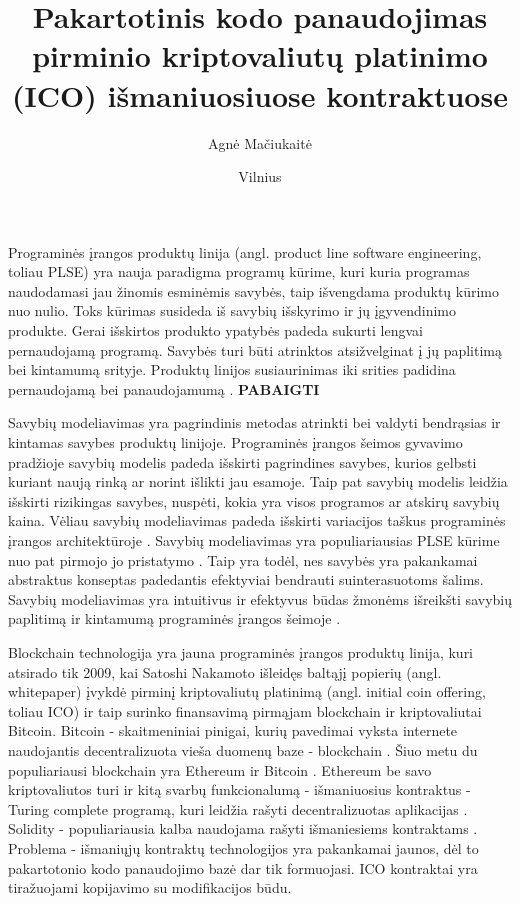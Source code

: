 \documentclass{VUMIFInfKursinis}
\title{Pakartotinis kodo panaudojimas pirminio kriptovaliutų platinimo (ICO) išmaniuosiuose kontraktuose}
\author{Agnė Mačiukaitė}
\date{Vilnius \\ \the\year}
\begin{document}
\maketitle

\tableofcontents

%
Programinės įrangos produktų linija (angl. product line software engineering, toliau PLSE) yra nauja paradigma programų kūrime, kuri kuria programas naudodamasi jau žinomis esminėmis savybės, taip išvengdama produktų kūrimo nuo nulio. Toks kūrimas susideda iš savybių išskyrimo ir jų įgyvendinimo produkte. Gerai išskirtos produkto ypatybės padeda sukurti lengvai pernaudojamą programą. Savybės turi būti atrinktos atsižvelginat į jų paplitimą bei kintamumą srityje. Produktų linijos susiaurinimas iki srities padidina pernaudojamą bei panaudojamumą \cite{Lee2015}. \textbf{PABAIGTI}

Savybių modeliavimas yra pagrindinis metodas atrinkti bei valdyti bendrąsias ir kintamas savybes produktų linijoje. Programinės įrangos šeimos gyvavimo pradžioje savybių modelis padeda išskirti pagrindines savybes, kurios gelbsti kuriant naują rinką ar  norint išlikti jau esamoje. Taip pat savybių modelis leidžia išskirti rizikingas savybes, nuspėti, kokia yra visos programos ar atskirų savybių kaina. Vėliau savybių modeliavimas padeda išskirti variacijos taškus programinės įrangos architektūroje \cite{Czarnecki2004}. Savybių modeliavimas yra populiariausias PLSE kūrime nuo pat pirmojo jo pristatymo \cite{Kang1990}. Taip yra todėl, nes savybės yra pakankamai abstraktus konseptas padedantis efektyviai bendrauti suinterasuotoms šalims. Savybių modeliavimas yra intuitivus ir efektyvus būdas žmonėms išreikšti savybių paplitimą ir kintamumą programinės įrangos šeimoje \cite{Kang2013}. 

Blockchain technologija yra jauna programinės įrangos produktų linija, kuri atsirado tik 2009, kai Satoshi Nakamoto išleidęs baltąjį popierių (angl. whitepaper) \cite{Nakamoto2008} įvykdė pirminį kriptovaliutų platinimą (angl. initial coin offering, toliau ICO)  ir taip surinko finansavimą pirmąjam blockchain ir kriptovaliutai Bitcoin. Bitcoin - skaitmeniniai pinigai, kurių pavedimai vyksta internete naudojantis decentralizuota vieša duomenų baze - blockchain \cite{Swan2015}. Šiuo metu du populiariausi blockchain yra Ethereum ir Bitcoin \cite{Luu}. Ethereum be savo kriptovaliutos turi ir kitą svarbų funkcionalumą - išmaniuosius kontraktus - Turing complete programą, kuri leidžia rašyti decentralizuotas aplikacijas \cite{Buterin2014}. Solidity - populiariausia kalba naudojama rašyti išmaniesiems kontraktams \cite{Dannen}. Problema - išmaniųjų kontraktų technologijos yra pakankamai jaunos, dėl to pakartotonio kodo panaudojimo bazė dar tik formuojasi. ICO kontraktai yra tiražuojami kopijavimo su modifikacijos būdu.
\end{document}
